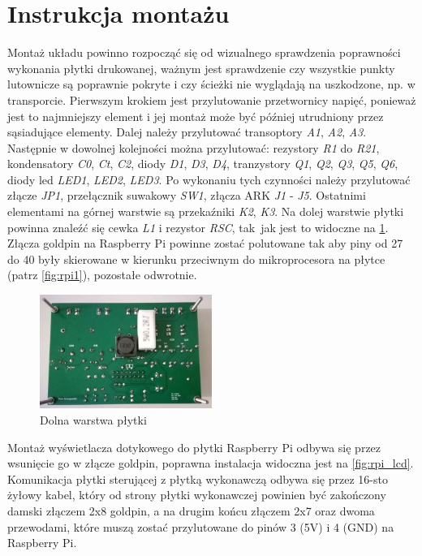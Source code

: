 \documentclass[12pt, eng, twoside, openany, final]{mgr}
\begin{document}
    \section{Instrukcja montażu}
    Montaż układu powinno rozpocząć się od wizualnego sprawdzenia poprawności wykonania płytki drukowanej, ważnym jest sprawdzenie czy wszystkie punkty lutownicze są poprawnie pokryte i czy ścieżki nie wyglądają na uszkodzone, np. w transporcie.
    Pierwszym krokiem jest przylutowanie przetwornicy napięć, ponieważ jest to najmniejszy element i jej montaż może być później utrudniony przez sąsiadujące elementy. Dalej należy przylutować transoptory \emph{A1}, \emph{A2}, \emph{A3}.  Następnie w dowolnej kolejności można przylutować: rezystory \emph{R1} do \emph{R21}, kondensatory \emph{C0}, \emph{Ct}, \emph{C2}, diody \emph{D1}, \emph{D3}, \emph{D4}, tranzystory \emph{Q1}, \emph{Q2}, \emph{Q3}, \emph{Q5}, \emph{Q6}, diody led \emph{LED1}, \emph{LED2}, \emph{LED3}. Po wykonaniu tych czynności należy przylutować złącze \emph{JP1}, przełącznik suwakowy \emph{SW1}, złącza ARK \emph{J1} - \emph{J5}. Ostatnimi elementami na górnej warstwie są przekaźniki \emph{K2}, \emph{K3}. Na dolej warstwie płytki powinna znaleźć się cewka \emph{L1} i rezystor \emph{RSC}, tak~jak jest to widoczne na \ref{fig:pcb_dol}. 
    Złącza goldpin na Raspberry Pi powinne zostać polutowane tak aby piny od 27 do 40 były skierowane w kierunku przeciwnym do mikroprocesora na płytce (patrz \ref{fig:rpi1}), pozostałe odwrotnie. 
            \begin{figure}[H]
            \begin{center}
                \includegraphics[width=0.5\textwidth]{dol.jpg}
                \caption{Dolna warstwa płytki} \label{fig:pcb_dol} 
            \end{center}
            \end{figure}
\noindent    Montaż wyświetlacza dotykowego do płytki Raspberry Pi odbywa się przez wsunięcie go w złącze goldpin, poprawna instalacja widoczna jest na \ref{fig:rpi_lcd}. Komunikacja płytki sterującej z płytką wykonawczą odbywa się przez 16-sto żyłowy kabel, który od strony płytki wykonawczej powinien być zakończony damski złączem 2x8 goldpin, a na drugim końcu złączem 2x7 oraz dwoma przewodami, które muszą zostać przylutowane do pinów 3 (5V) i 4 (GND) na Raspberry Pi. 
\newpage
\end{document}
